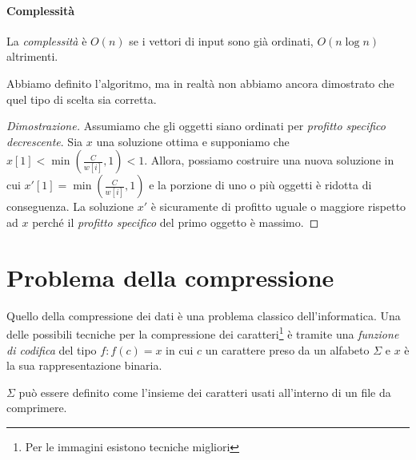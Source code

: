 \paragraph{Complessità}
La \emph{complessità} è $O(n)$ se i vettori di input sono già ordinati, $O(n\log
n)$ altrimenti.

\bigskip\noindent
Abbiamo definito l'algoritmo, ma in realtà non abbiamo ancora dimostrato che
quel tipo di scelta sia corretta.

\begin{proof}[Dimostrazione]
    Assumiamo che gli oggetti siano ordinati per \emph{profitto specifico
    decrescente}. Sia $x$ una soluzione ottima e supponiamo che $x[1]<\min\left(
    \frac{C}{w[i]}, 1\right)<1$. Allora, possiamo costruire una nuova soluzione
    in cui $x'[1]=\min\left(\frac{C}{w[i]}, 1\right)$ e la porzione di uno o
    più oggetti è ridotta di conseguenza. La soluzione $x'$ è sicuramente di
    profitto uguale o maggiore rispetto ad $x$ perché il \emph{profitto
    specifico} del primo oggetto è massimo.
\end{proof}

\section{Problema della compressione}
Quello della compressione dei dati è una problema classico dell'informatica.
Una delle possibili tecniche per la compressione dei caratteri\footnote{Per
le immagini esistono tecniche migliori} è tramite una \emph{funzione di codifica}
del tipo $f:f(c)=x$ in cui $c$ un carattere preso da un alfabeto $\Sigma$ e
$x$ è la sua rappresentazione binaria.

\begin{note}
    $\Sigma$ può essere definito come l'insieme dei caratteri usati all'interno
    di un file da comprimere.
\end{note}


